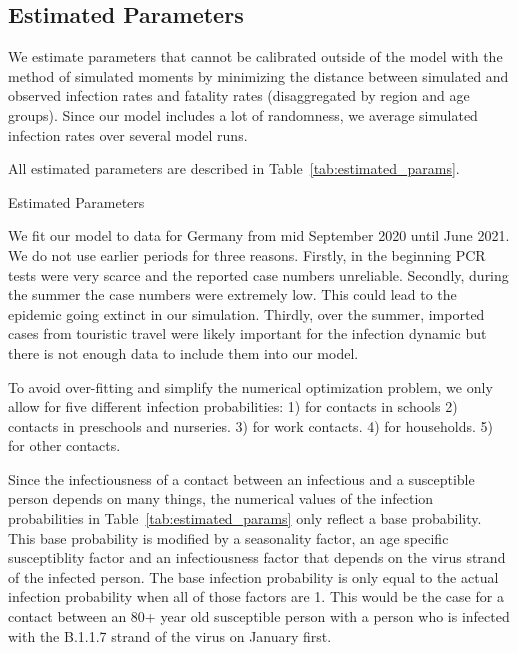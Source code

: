 \subsection{Estimated Parameters}
\label{subsec:estimated_params}


\FloatBarrier

We estimate parameters that cannot be calibrated outside of the model with the
method of simulated moments \citep{McFadden1989} by minimizing the distance between
simulated and observed infection rates and fatality rates (disaggregated by region
and age groups). Since our model includes a lot of randomness, we
average simulated infection rates over several model runs.

All estimated parameters are described in Table~\ref{tab:estimated_params}.

\begin{landscape}

\begin{table}[htb]
    \centering
    \caption{Estimated Parameters}
    \label{tab:estimated_params}
    
\end{table}

\end{landscape}


We fit our model to data for Germany from mid September 2020 until June 2021. We do not
use earlier periods for three reasons. Firstly, in the beginning PCR tests were very
scarce and the reported case numbers unreliable. Secondly, during the summer the case
numbers were extremely low. This could lead to the epidemic going extinct in our
simulation. Thirdly, over the summer, imported cases from touristic travel were likely
important for the infection dynamic but there is not enough data to include them into our
model.

To avoid over-fitting and simplify the numerical optimization problem, we only allow for
five different infection probabilities: 1) for contacts in schools 2) contacts in
preschools and nurseries. 3) for work contacts. 4) for households. 5) for other
contacts.

Since the infectiousness of a contact between an infectious and a susceptible
person depends on many things, the numerical values of the infection probabilities in
Table~\ref{tab:estimated_params} only reflect a base probability. This
base probability is modified by a seasonality factor, an age specific
susceptiblity factor and an infectiousness factor that depends on the virus strand
of the infected person. The base infection probability is only equal to the actual
infection probability when all of those factors are 1. This would be the
case for a contact between an 80+ year old susceptible person with a person who is
infected with the B.1.1.7 strand of the virus on January first.

